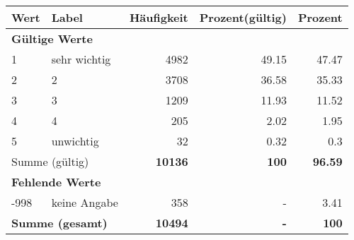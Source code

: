      \begin{longtable}{lXrrr}
     \toprule
     \textbf{Wert} & \textbf{Label} & \textbf{Häufigkeit} & \textbf{Prozent(gültig)} & \textbf{Prozent} \\
     \endhead
     \midrule
     \multicolumn{5}{l}{\textbf{Gültige Werte}}\\

     1 &
     \multicolumn{1}{X}{ sehr wichtig   } &


       \num{4982} &
       \num[round-mode=places,round-precision=2]{49,15} &
         \num[round-mode=places,round-precision=2]{47,47} \\

     2 &
     \multicolumn{1}{X}{ 2   } &


       \num{3708} &
       \num[round-mode=places,round-precision=2]{36,58} &
         \num[round-mode=places,round-precision=2]{35,33} \\

     3 &
     \multicolumn{1}{X}{ 3   } &


       \num{1209} &
       \num[round-mode=places,round-precision=2]{11,93} &
         \num[round-mode=places,round-precision=2]{11,52} \\

     4 &
     \multicolumn{1}{X}{ 4   } &


       \num{205} &
       \num[round-mode=places,round-precision=2]{2,02} &
         \num[round-mode=places,round-precision=2]{1,95} \\

     5 &
     \multicolumn{1}{X}{ unwichtig   } &


       \num{32} &
       \num[round-mode=places,round-precision=2]{0,32} &
         \num[round-mode=places,round-precision=2]{0,3} \\
     \midrule
     \multicolumn{2}{l}{Summe (gültig)} &
       \textbf{\num{10136}} &
     \textbf{100} &
       \textbf{\num[round-mode=places,round-precision=2]{96,59}} \\
     \multicolumn{5}{l}{\textbf{Fehlende Werte}}\\
       -998 &
       keine Angabe &
         \num{358} &
        - &
         \num[round-mode=places,round-precision=2]{3,41} \\
     \midrule
     \multicolumn{2}{l}{\textbf{Summe (gesamt)}} &
          \textbf{\num{10494}} &
        \textbf{-} &
        \textbf{100} \\
     \bottomrule
     \end{longtable}
     
